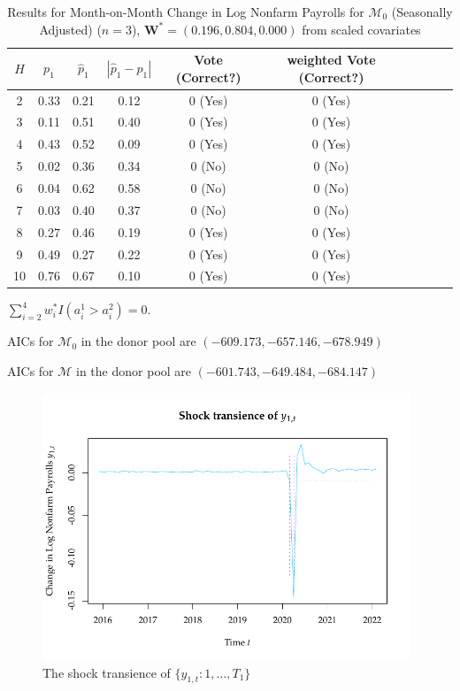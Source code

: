 \documentclass[11pt]{article}
\def\mbf#1{\mathbf{#1}} %
\def\mc#1{\mathcal{#1}} %
\def\mc#1{\mathcal{#1}}
\theoremstyle{definition}
\begin{document}
\begin{table}[H]
	\caption{Results for Month-on-Month Change in Log Nonfarm Payrolls for $\mc{M}_0$ (Seasonally Adjusted) ($n=3$), $\mbf{W}^* = (0.196, 0.804, 0.000)$ from scaled covariates}   \label{uemtable}
\begin{center}
  \begin{tabular}{cccccccccr}
     $H$   &   $p_1$ & $\hat{p}_1$ & $|\hat{p}_1-p_1|$ & Vote (Correct?) & weighted Vote (Correct?)   \\
     \hline 
 2   & 0.33 & 0.21 & 0.12 & 0 (Yes) & 0 (Yes) \\ 
   3   & 0.11 & 0.51 & 0.40 & 0 (Yes) & 0 (Yes) \\ 
   4   & 0.43 & 0.52 & 0.09 & 0 (Yes) & 0 (Yes) \\ 
   5   & 0.02 & 0.36 & 0.34 & 0 (No) & 0 (No) \\  
   6   & 0.04 & 0.62 & 0.58 & 0 (No) & 0 (No) \\ 
   7   & 0.03 & 0.40 & 0.37 & 0 (No) & 0 (No) \\ 
   8  & 0.27 & 0.46 & 0.19 & 0 (Yes) & 0 (Yes) \\ 
   9   & 0.49 & 0.27 & 0.22 & 0 (Yes) & 0 (Yes) \\ 
   10  & 0.76 & 0.67 & 0.10 & 0 (Yes) & 0 (Yes) \\ 
  \end{tabular}
\end{center}	
\end{table}

$\sum_{i=2}^4 w_i^* I(a_i^1 > a_i^2)=0$. 

AICs for $\mc{M}_0$ in the donor pool are $(-609.173, -657.146,-678.949)$

AICs for $\mc{M}$ in the donor pool are $(-601.743,-649.484,-684.147)$


\begin{figure}[H]
	\begin{center}
		\includegraphics[height = 8cm]{UEMtransience.pdf}
		\caption{The shock transience of $\{y_{1,t} \colon 1, \ldots, T_1\}$} \label{uemshocktransience}
	\end{center}	
\end{figure}
\end{document}
